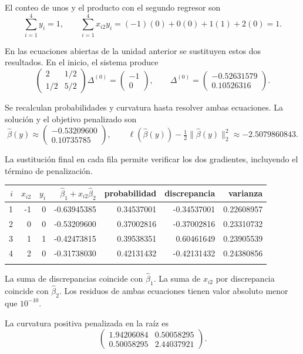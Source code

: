 \documentclass[11pt,a4paper]{article}
\begin{document}
El conteo de unos y el producto con el segundo regresor son
\[
\sum_{i=1}^4 y_i=1,\qquad\sum_{i=1}^4x_{i2}y_i=(-1)(0)+0(0)+1(1)+2(0)=1.
\]

En las ecuaciones abiertas de la unidad anterior se sustituyen
estos dos resultados. En el inicio, el sistema produce
\[
\begin{pmatrix}2&1/2\\1/2&5/2\end{pmatrix}\Delta^{(0)}=\begin{pmatrix}-1\\0\end{pmatrix},\qquad\Delta^{(0)}=\begin{pmatrix}-0.52631579\\0.10526316\end{pmatrix}.
\]

Se recalculan probabilidades y curvatura hasta resolver
ambas ecuaciones. La solución y el objetivo penalizado son
\[
\widehat\beta(y)\approx\begin{pmatrix}-0.53209600\\0.10735785\end{pmatrix},\qquad \ell(\widehat\beta(y))-\tfrac12\|\widehat\beta(y)\|_2^2\approx-2.5079860843.
\]

La sustitución final en cada fila permite verificar
los dos gradientes, incluyendo el término de penalización.
\begin{center}\scriptsize
\begin{tabular}{rrrrrrr}\toprule
\(i\)&\(x_{i2}\)&\(y_i\)&\(\widehat\beta_1+x_{i2}\widehat\beta_2\)&probabilidad&discrepancia&varianza\\\midrule
1&-1&0&-0.63945385&0.34537001&-0.34537001&0.22608957\\
2&0&0&-0.53209600&0.37002816&-0.37002816&0.23310732\\
3&1&1&-0.42473815&0.39538351&0.60461649&0.23905539\\
4&2&0&-0.31738030&0.42131432&-0.42131432&0.24380856\\
\\\bottomrule\end{tabular}\end{center}
La suma de discrepancias coincide con \(\widehat\beta_1\).
La suma de \(x_{i2}\) por discrepancia coincide con
\(\widehat\beta_2\). Los residuos de ambas ecuaciones
tienen valor absoluto menor que \(10^{-10}\).

La curvatura positiva penalizada en la raíz es
\[
\begin{pmatrix}1.94206084&0.50058295\\0.50058295&2.44037921\end{pmatrix}.
\]
\end{document}
